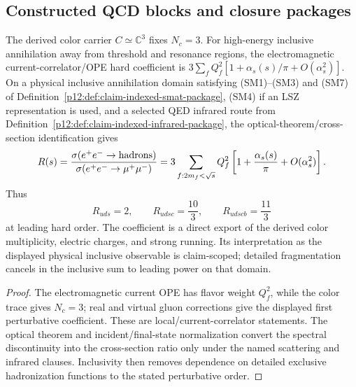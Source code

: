 \documentclass[12pt,a4paper]{article}
\begin{document}
\subsection[Constructed QCD blocks and downstream closure packages]
{Constructed QCD blocks and closure packages}
\label{p11:sec:validation}
\label{p11:sec:constructed-qcd-blocks}


\begin{theorem}
\label{p11:thm:inclusive-color-counting-export}
The derived color carrier \(C\simeq\mathbb C^3\) fixes \(N_c=3\).  For high-energy inclusive annihilation away from threshold and resonance regions,
the electromagnetic current-correlator/OPE hard coefficient is
\(3\sum_fQ_f^2[1+\alpha_s(s)/\pi+O(\alpha_s^2)]\).  On a physical inclusive
annihilation domain satisfying \textnormal{(SM1)--(SM3)} and
\textnormal{(SM7)} of Definition~\ref{p12:def:claim-indexed-smat-package},
\textnormal{(SM4)} if an LSZ representation is used, and a selected QED
infrared route from Definition~\ref{p12:def:claim-indexed-infrared-package},
the optical-theorem/cross-section identification gives
\begin{equation}
\label{p11:eq:eplus-eminus-r-ratio}
R(s)=\frac{\sigma(e^+e^-\to{\rm hadrons})}{\sigma(e^+e^-\to\mu^+\mu^-)}
=3\sum_{f:2m_f<\sqrt s}Q_f^2\left[1+\frac{\alpha_s(s)}{\pi}+O(\alpha_s^2)\right].
\end{equation}
Thus
\begin{equation}
\label{p11:eq:r-ratio-threshold-values}
R_{uds}=2,
\qquad
R_{udsc}=\frac{10}{3},
\qquad
R_{udscb}=\frac{11}{3}
\end{equation}
at leading hard order.  The coefficient is a direct export of the derived
color multiplicity, electric charges, and strong running.  Its interpretation
as the displayed physical inclusive observable is claim-scoped; detailed
fragmentation cancels in the inclusive sum to leading power on that domain.
\end{theorem}
\begin{proof}
The electromagnetic current OPE has flavor weight \(Q_f^2\), while the color
trace gives \(N_c=3\); real and virtual gluon corrections give the displayed
first perturbative coefficient.  These are local/current-correlator statements.
The optical theorem and incident/final-state normalization convert the
spectral discontinuity into the cross-section ratio only under the named
scattering and infrared clauses.  Inclusivity then removes dependence on
detailed exclusive hadronization functions to the stated perturbative order.
\end{proof}
\end{document}
